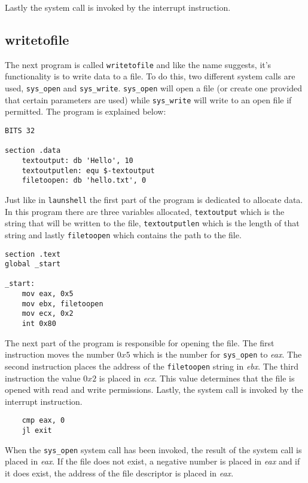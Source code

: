 \documentclass[11pt,twoside]{eitExjobb}
\begin{document}
Lastly the system call is invoked by the interrupt instruction.



\subsection{writetofile}
The next program is called \texttt{writetofile} and like the name suggests, it's functionality is to write data to a file. To do this, two different system calls are used, \texttt{sys\_open} and \texttt{sys\_write}. \texttt{sys\_open} will open a file (or create one provided that certain parameters are used) while \texttt{sys\_write} will write to an open file if permitted. The program is explained below:

\begin{verbatim}
BITS 32

section .data
    textoutput: db 'Hello', 10
    textoutputlen: equ $-textoutput
    filetoopen: db 'hello.txt', 0
\end{verbatim}

\noindent Just like in \texttt{launshell} the first part of the program is dedicated to allocate data. In this program there are three variables allocated, \texttt{textoutput} which is the string that will be written to the file, \texttt{textoutputlen} which is the length of that string and lastly \texttt{filetoopen} which contains the path to the file.

\begin{verbatim}
section .text
global _start

_start:
    mov eax, 0x5
    mov ebx, filetoopen
    mov ecx, 0x2
    int 0x80
\end{verbatim}

\noindent The next part of the program is responsible for opening the file. The first instruction moves the number $0x5$ which is the number for \texttt{sys\_open} to \emph{eax}. The second instruction places the address of the \texttt{filetoopen} string in \emph{ebx}. The third instruction the value $0x2$ is placed in \emph{ecx}. This value determines that the file is opened with read and write permissions. Lastly, the system call is invoked by the interrupt instruction.

\begin{verbatim}
    cmp eax, 0
    jl exit
\end{verbatim}

\noindent When the \texttt{sys\_open} system call has been invoked, the result of the system call is placed in \emph{eax}. If the file does not exist, a negative number is placed in \emph{eax} and if it does exist, the address of the file descriptor is placed in \emph{eax}. 
 
\end{document}
